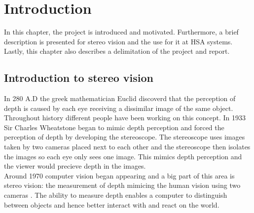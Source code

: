 \chapter{Introduction}\label{ch:introduction}
In this chapter, the project is introduced and motivated. Furthermore, a brief description is presented for stereo vision and the use for it at HSA systems. Lastly, this chapter also describes a delimitation of the project and report.\\

\section{Introduction to stereo vision}\label{sec:stereo vision}
In 280 A.D the greek mathematician Euclid discoverd that the perception of depth is caused by each eye receiving a dissimilar image of the same object. Throughout history different people have been working on this concept. In 1933 Sir Charles Wheatstone began to mimic depth perception and forced the perception of depth by developing the stereoscope. The stereoscope uses images taken by two cameras placed next to each other and the stereoscope then isolates the images so each eye only sees one image. This mimics depth perception and the viewer would precieve depth in the images. \cite{lit:historyofstereophoto}\\

Around 1970 computer vision began appearing and a big part of this area is stereo vision: the measurement of depth mimicing the human vision using two cameras \cite{Szeliski2010}. The ability to measure depth enables a computer to distinguish between objects and hence better interact with and react on the world.\\

